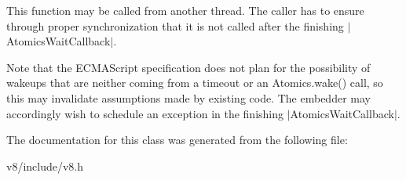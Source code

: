 This function may be called from another thread. The caller has to ensure through proper synchronization that it is not called after the finishing $\vert$\+Atomics\+Wait\+Callback$\vert$.

Note that the E\+C\+M\+A\+Script specification does not plan for the possibility of wakeups that are neither coming from a timeout or an {\ttfamily Atomics.\+wake()} call, so this may invalidate assumptions made by existing code. The embedder may accordingly wish to schedule an exception in the finishing $\vert$\+Atomics\+Wait\+Callback$\vert$. 

The documentation for this class was generated from the following file\+:\begin{DoxyCompactItemize}
\item 
v8/include/v8.\+h\end{DoxyCompactItemize}
